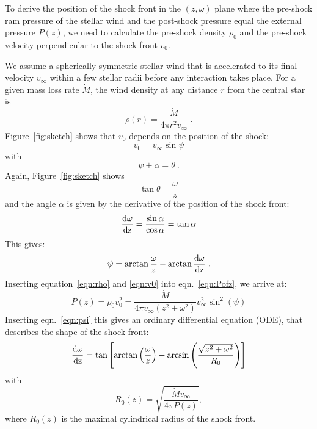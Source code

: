 To derive the position of the shock front in the $(z, \omega)$ plane where the pre-shock ram pressure of the stellar wind and the post-shock pressure equal the external pressure $P(z)$, we need to calculate the pre-shock density $\rho_0$ and the pre-shock velocity perpendicular to the shock front $v_0$.

We assume a spherically symmetric stellar wind that is accelerated to its final velocity $v_{\infty}$ within a few stellar radii before any interaction takes place. For a given mass loss rate $\dot M$, the wind density at any distance $r$ from the central star is 
\begin{equation}\label{eqn:rho}
\rho(r) = \frac{\dot M}{4 \pi r^2 v_{\infty}}\ .
\end{equation}
Figure~\ref{fig:sketch} shows that $v_0$ depends on the position of the shock:
\begin{equation}
\label{eqn:v0}v_0 = v_{\infty} \sin \psi
\end{equation}
with 
\begin{equation}\label{eqn:angle}
\psi+\alpha =  \theta \ .
\end{equation}
Again, Figure~\ref{fig:sketch} shows
\begin{equation}\label{eqn:theta}
\tan\theta = \frac{\omega}{z}
\end{equation}
and the angle $\alpha$ is given by the derivative of the position of the shock front:
\begin{equation}\label{eqn:deriv}
\frac{\rm{d}\omega}{\rm{d}z} = \frac{\sin \alpha}{\cos \alpha} = \tan{\alpha}
\end{equation}
This gives:
\begin{equation}\label{eqn:psi}
\psi = \arctan{\frac{\omega}{z}} - \arctan{\frac{\rm{d}\omega}{\rm{d}z}}\ .
\end{equation}
Inserting equation~\ref{eqn:rho} and \ref{eqn:v0} into eqn.~\ref{eqn:Pofz}, we arrive at: 
\begin{equation}\label{eqn:P}
P(z) = \rho_0 v_0^2 = \frac{\dot{M}}{4\pi v_{\infty}(z^2+\omega^2)} v_{\infty}^2 \sin^2(\psi)
\end{equation}
Inserting eqn.~\ref{eqn:psi} this gives an ordinary differential equation (ODE), that describes the shape of the shock front:
\begin{equation}\label{eqn:ode}
\frac{\rm{d}\omega}{\rm{d}z} = \tan\left[\arctan\left(\frac{\omega}{z}\right)-\arcsin\left(\frac{\sqrt{z^2+\omega^2}}{R_0}\right)\right]
\end{equation}
with
\begin{equation}\label{eqn:r0}
R_0(z) = \sqrt{\frac{\dot{M} v_{\infty}}{4\pi P(z)}},
\end{equation}
where $R_0(z)$ is the maximal cylindrical radius of the shock front.

